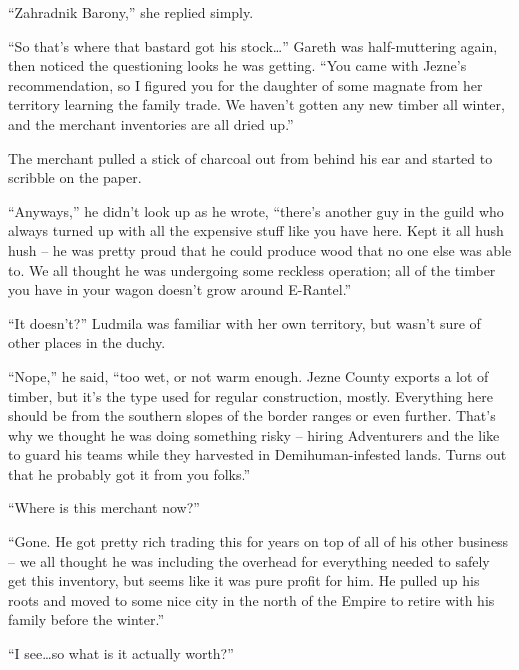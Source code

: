  

“Zahradnik Barony,” she replied simply.

 

“So that’s where that bastard got his stock…” Gareth was half-muttering again, then noticed the questioning looks he was getting. “You came with Jezne’s recommendation, so I figured you for the daughter of some magnate from her territory learning the family trade. We haven’t gotten any new timber all winter, and the merchant inventories are all dried up.”

 

The merchant pulled a stick of charcoal out from behind his ear and started to scribble on the paper.

 

“Anyways,” he didn’t look up as he wrote, “there’s another guy in the guild who always turned up with all the expensive stuff like you have here. Kept it all hush hush – he was pretty proud that he could produce wood that no one else was able to. We all thought he was undergoing some reckless operation; all of the timber you have in your wagon doesn’t grow around E-Rantel.”

 

“It doesn’t?” Ludmila was familiar with her own territory, but wasn’t sure of other places in the duchy.

 

“Nope,” he said, “too wet, or not warm enough. Jezne County exports a lot of timber, but it’s the type used for regular construction, mostly. Everything here should be from the southern slopes of the border ranges or even further. That’s why we thought he was doing something risky – hiring Adventurers and the like to guard his teams while they harvested in Demihuman-infested lands. Turns out that he probably got it from you folks.”

 

“Where is this merchant now?”

 

“Gone. He got pretty rich trading this for years on top of all of his other business – we all thought he was including the overhead for everything needed to safely get this inventory, but seems like it was pure profit for him. He pulled up his roots and moved to some nice city in the north of the Empire to retire with his family before the winter.”

 

“I see…so what is it actually worth?”

 

